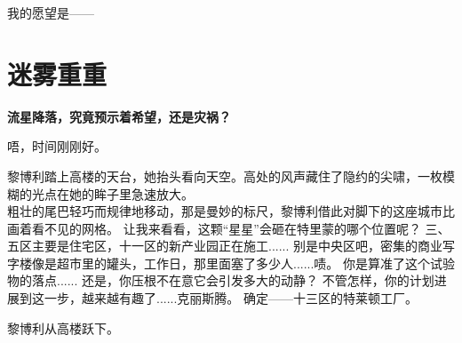 \documentclass[openany]{book}
\begin{document}
\clearpage
{}
\begin{center}
    \begin{minipage}{.6\textwidth}
        \begin{center}
            我的愿望是——
        \end{center}
    \end{minipage}
\end{center}


\chapter{迷雾重重}
\begin{center} \textbf{流星降落，究竟预示着希望，还是灾祸？}\end{center} \par
\clearpage

\begin{dialogue}
     唔，时间刚刚好。\par
    黎博利踏上高楼的天台，她抬头看向天空。高处的风声藏住了隐约的尖啸，一枚模糊的光点在她的眸子里急速放大。\\
    粗壮的尾巴轻巧而规律地移动，那是曼妙的标尺，黎博利借此对脚下的这座城市比画着看不见的网格。
     让我来看看，这颗“星星”会砸在特里蒙的哪个位置呢？
     三、五区主要是住宅区，十一区的新产业园正在施工......
     别是中央区吧，密集的商业写字楼像是超市里的罐头，工作日，那里面塞了多少人......啧。
     你是算准了这个试验物的落点......
     还是，你压根不在意它会引发多大的动静？
     不管怎样，你的计划进展到这一步，越来越有趣了......克丽斯腾。
     确定——十三区的特莱顿工厂。
\end{dialogue}
\par
黎博利从高楼跃下。
\end{document}
